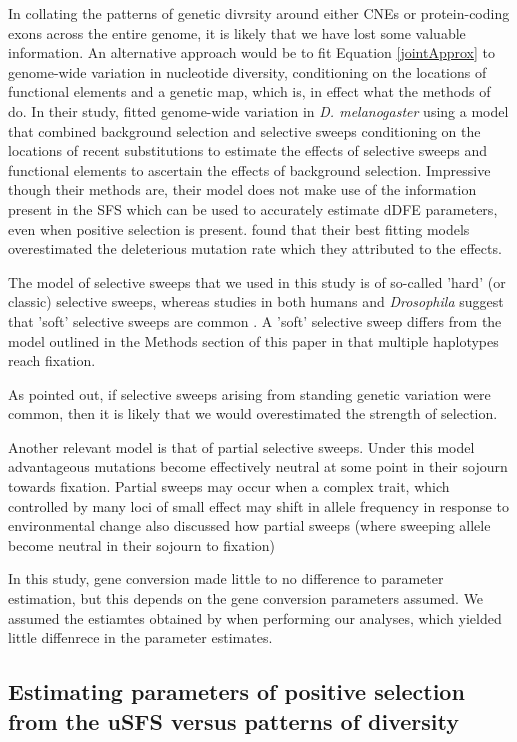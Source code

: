 \documentclass[11pt]{article}
\begin{document}
In collating the patterns of genetic divrsity around either CNEs or protein-coding exons across the entire genome, it is likely that we have lost some valuable information. An alternative approach would be to fit Equation \ref{jointApprox} to genome-wide variation in nucleotide diversity, conditioning on the locations of functional elements and a genetic map, which is, in effect what the methods of \cite{RN274} do. In their study,\cite{RN274} fitted genome-wide variation in \textit{D. melanogaster} using a model that combined background selection and selective sweeps conditioning on the locations of recent substitutions to estimate the effects of selective sweeps and functional elements to ascertain the effects of background selection. Impressive though their methods are, their model does not make use of the information present in the SFS which can be used to accurately estimate dDFE parameters, even when positive selection is present. \cite{RN274} found that their best fitting models overestimated the deleterious mutation rate which they attributed to the effects.

The model of selective sweeps that we used in this study is of so-called 'hard' (or classic) selective sweeps, whereas studies in both humans and \textit{Drosophila} suggest that 'soft' selective sweeps are common \citep{RN303, RN208, RN338}. A 'soft' selective sweep differs from the model outlined in the Methods section of this paper in that multiple haplotypes reach fixation.

As \cite{RN274} pointed out, if selective sweeps arising from standing genetic variation were common, then it is likely that we would overestimated the strength of selection.

Another relevant model is that of partial selective sweeps. Under this model advantageous mutations become effectively neutral at some point in their sojourn towards fixation. 
Partial sweeps may occur when a complex trait, which  controlled by many loci of small effect may shift in allele frequency in response to environmental change 
\cite{RN274} also discussed how partial sweeps (where sweeping allele become neutral in their sojourn to fixation)


In this study, gene conversion made little to no difference to parameter estimation, but this depends on the gene conversion parameters assumed. 
We assumed the estiamtes obtained by \cite{RN263} when performing our analyses, which yielded little diffenrece in the parameter estimates.

\subsection*{Estimating parameters of positive selection from the uSFS versus patterns of diversity}
\end{document}
